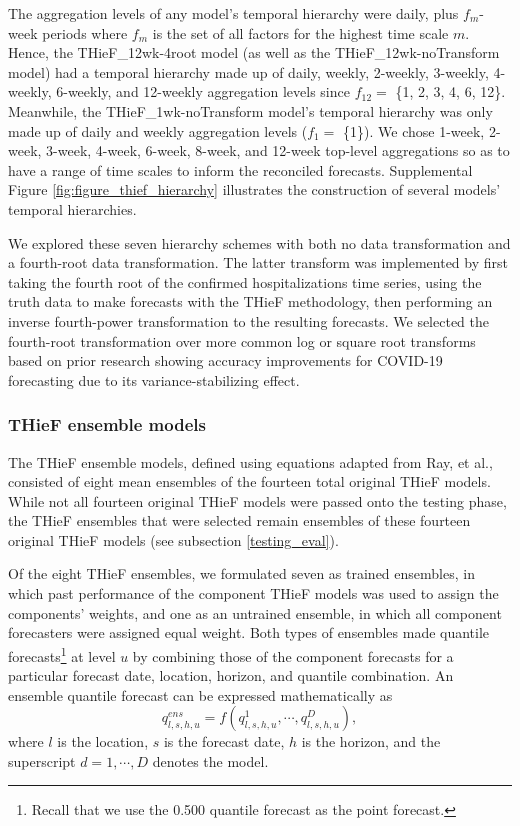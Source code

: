 \documentclass[12pt]{article}
\begin{document}
The aggregation levels of any model's temporal hierarchy were daily, plus $f_m$-week periods where $f_m$ is the set of all factors for the highest time scale $m$. Hence, the THieF\_12wk-4root model (as well as the THieF\_12wk-noTransform model) had a temporal hierarchy made up of daily, weekly, 2-weekly, 3-weekly, 4-weekly, 6-weekly, and 12-weekly aggregation levels since $f_{12}=$ \{1, 2, 3, 4, 6, 12\}. Meanwhile, the THieF\_1wk-noTransform model's temporal hierarchy was only made up of daily and weekly aggregation levels ($f_1=$ \{1\}). We chose 1-week, 2-week, 3-week, 4-week, 6-week, 8-week, and 12-week top-level aggregations so as to have a range of time scales to inform the reconciled forecasts. Supplemental Figure \ref{fig:figure_thief_hierarchy} illustrates the construction of several models' temporal hierarchies.

We explored these seven hierarchy schemes with both no data transformation and a fourth-root data transformation. The latter transform was implemented by first taking the fourth root of the confirmed hospitalizations time series, using the truth data to make forecasts with the THieF methodology, then performing an inverse fourth-power transformation to the resulting forecasts. We selected the fourth-root transformation over more common log or square root transforms based on prior research showing accuracy improvements for COVID-19 forecasting due to its variance-stabilizing effect\cite{4root_transform}.

\subsubsection{THieF ensemble models} \label{thief_ensembles}
The THieF ensemble models, defined using equations adapted from Ray, et al.\cite{ensemble_methods}, consisted of eight mean ensembles of the fourteen total original THieF models. While not all fourteen original THieF models were passed onto the testing phase, the THieF ensembles that were selected remain ensembles of these fourteen original THieF models (see subsection \ref{testing_eval}).

Of the eight THieF ensembles, we formulated seven as trained ensembles, in which past performance of the component THieF models was used to assign the components' weights, and one as an untrained ensemble, in which all component forecasters were assigned equal weight\cite{ensemble_methods}. Both types of ensembles made quantile forecasts\footnote{Recall that we use the 0.500 quantile forecast as the point forecast.} at level $u$ by combining those of the component forecasts for a particular forecast date, location, horizon, and quantile combination. An ensemble quantile forecast can be expressed mathematically as \[q_{l,s,h,u}^{ens} = f(q_{l,s,h,u}^1, \cdots, q_{l,s,h,u}^D),\] where $l$ is the location, $s$ is the forecast date, $h$ is the horizon, and the superscript $d = 1, \cdots, D$ denotes the model\cite{ensemble_methods}.
\end{document}
